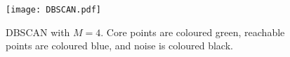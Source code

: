 
\begin{figure}[H]
\centering
\texttt{[image: DBSCAN.pdf]}
\caption{DBSCAN with $M=4$. Core points are coloured green, reachable points are coloured blue, and noise is coloured black.}
\end{figure}


